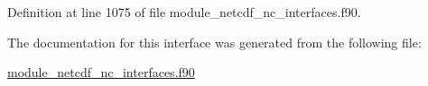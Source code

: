 Definition at line 1075 of file module\+\_\+netcdf\+\_\+nc\+\_\+interfaces.\+f90.



The documentation for this interface was generated from the following file\+:\begin{DoxyCompactItemize}
\item 
\hyperlink{module__netcdf__nc__interfaces_8f90}{module\+\_\+netcdf\+\_\+nc\+\_\+interfaces.\+f90}\end{DoxyCompactItemize}
